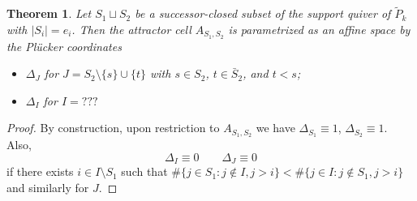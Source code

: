 \documentclass{amsart}
\newtheorem{theorem}{Theorem}
\newtheorem{lemma}[theorem]{Lemma}
\numberwithin{equation}{section}
\newcommand{\Hom}{\operatorname{Hom}}
\newcommand{\bfe}{\mathbf{e}}
\newcommand{\bff}{\mathbf{f}}
\newcommand{\bfg}{\mathbf{g}}
\begin{document}
  \begin{theorem}
    Let $S_1\sqcup S_2$ be a successor-closed subset of the support quiver of $\tilde P_k$ with $|S_i|=e_i$.
    Then the attractor cell $A_{S_1,S_2}$ is parametrized as an affine space by the Pl\"ucker coordinates 
    \begin{itemize}
      \item $\Delta_J$ for $J=S_2\setminus\{s\}\cup\{t\}$ with $s\in S_2$, $t\in\bar{S}_2$, and $t<s$;
      \item $\Delta_I$ for $I=???$
    \end{itemize}
  \end{theorem}
  \begin{proof}
    By construction, upon restriction to $A_{S_1,S_2}$ we have $\Delta_{S_1}\equiv 1$, $\Delta_{S_2}\equiv 1$.
    Also,
    \[\Delta_I\equiv 0 \qquad \Delta_J\equiv 0\]
    if there exists $i\in I\setminus S_1$ such that $\#\{j\in S_1:j\notin I, j>i\} < \#\{j\in I:j\notin S_1,j>i\}$ and similarly for $J$.
  \end{proof}


\end{document}

